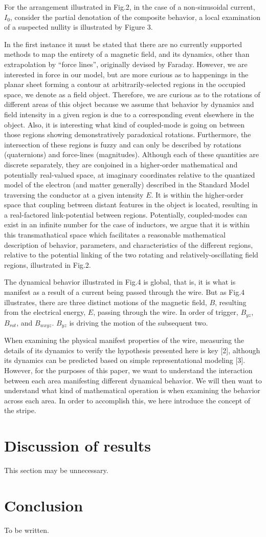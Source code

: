 \documentclass[]{article}
\begin{document}
For the arrangement illustrated in Fig.2, in the case of a non-sinusoidal current, ${{I}_{0}}$, consider the partial denotation of the composite behavior, a local examination of a suspected nullity is illustrated by Figure 3.

In the first instance it must be stated that there are no currently supported methods to map the entirety of a magnetic field, and its dynamics, other than extrapolation by “force lines”, originally devised by Faraday. However, we are interested in force in our model, but are more curious as to happenings in the planar sheet forming a contour at arbitrarily-selected regions in the occupied space, we denote as a field object. Therefore, we are curious as to the rotations of different areas of this object because we assume that behavior by dynamics and field intensity in a given region is due to a corresponding event elsewhere in the object. Also, it is interesting what kind of coupled-mode is going on between those regions showing demonstratively paradoxical rotations. Furthermore, the intersection of these regions is fuzzy and can only be described by rotations (quaternions) and force-lines (magnitudes). Although each of these quantities are discrete separately, they are conjoined in a higher-order  mathematical and potentially real-valued space, at imaginary coordinates relative to the quantized model of the electron (and matter generally) described in the Standard Model traversing the conductor at a given intensity $E$. It is within the higher-order space that coupling between distant features in the object is located, resulting in a real-factored link-potential between regions. Potentially, coupled-modes can exist in an infinite number for the case of inductors, we argue that it is within this transmathatical space which facilitates a reasonable mathematical description of behavior, parameters, and characteristics of the different regions, relative to the potential linking of the two rotating and relatively-oscillating field regions, illustrated in Fig.2.

The dynamical behavior illustrated in Fig.4 is global, that is, it is what is manifest as a result of a current being passed through the wire. But as Fig.4 illustrates, there are three distinct motions of the magnetic field, $B$, resulting from the electrical energy, $E$, passing through the wire. In order of trigger, $B_{yz}$, $B_{rot}$, and $B_{wxyz}$. $B_{yz}$ is driving the motion of the subsequent two.

When examining the physical manifest properties of the wire, measuring the details of its dynamics to verify the hypothesis presented here is key [2], although its dynamics can be predicted based on simple representational modeling [3]. However, for the purposes of this paper, we want to understand the interaction between each area manifesting different dynamical behavior. We will then want to understand what kind of mathematical operation is when examining the behavior across each area. In order to accomplish this, we here introduce the concept of the stripe.

\section{Discussion of results}
This section may be unnecessary.

\section{Conclusion}
To be written.
\end{document}
